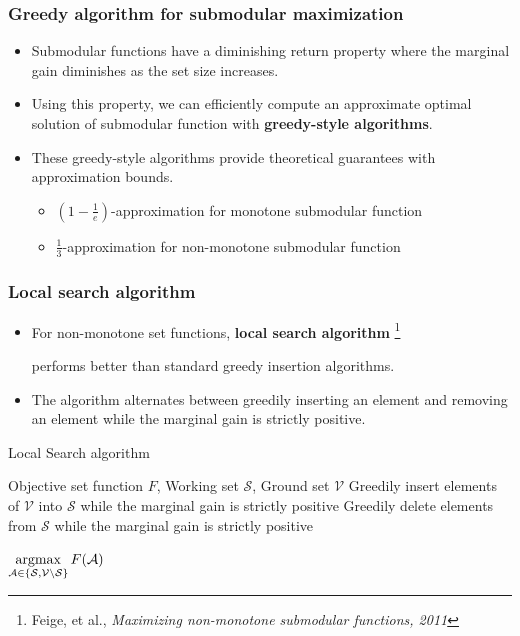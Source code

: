 \documentclass[10pt,mathserif]{beamer}
\newcommand\blfootnote[1]{%
  \begingroup
  \renewcommand\thefootnote{}\footnote{#1}%
  \addtocounter{footnote}{-1}%
  \endgroup
}
\newcommand{\algorithmicinput}{\textbf{input}}
\newcommand{\algorithmicoutput}{\textbf{output}}
\newcommand{\INPUT}{\item[\algorithmicinput]}
\newcommand{\OUTPUT}{\item[\algorithmicoutput]}
\begin{document}
\begin{frame}
\frametitle{Greedy algorithm for submodular maximization}
\begin{itemize}\itemsep=12pt
\item Submodular functions have a diminishing return property where the marginal gain diminishes as the set size increases.\pause
\item Using this property, we can efficiently compute an approximate optimal solution of submodular function with \textbf{greedy-style algorithms}.\pause
\item These greedy-style algorithms provide theoretical guarantees with approximation bounds.
\vspace{0.5em}
\begin{itemize}\itemsep=6pt
    \item $(1-\frac{1}{e})$-approximation for monotone submodular function
    \item $\frac{1}{3}$-approximation for non-monotone submodular function
\end{itemize} 
\end{itemize}
\end{frame}

\begin{frame}
\frametitle{Local search algorithm}
\begin{itemize}\itemsep=10pt
    \item For non-monotone set functions, \textbf{local search algorithm}\blfootnote{Feige, et al., \textit{Maximizing non-monotone submodular functions, 2011}} performs better than standard greedy insertion algorithms.\pause
    \item The algorithm alternates between greedily inserting an element and removing an element while the marginal gain is strictly positive.\pause
\end{itemize}
\setcounter{algorithm}{0}
\begin{algorithm}[H]
\footnotesize
\caption{Local Search algorithm}
\label{alg:local_search}
\begin{algorithmic}[1]
\INPUT Objective set function $F$, Working set $\mathcal{S}$, Ground set $\mathcal{V}$
\STATE Greedily insert elements of $\mathcal{V}$ into $\mathcal{S}$ while the marginal gain is strictly positive
\STATE Greedily delete elements from $\mathcal{S}$ while the marginal gain is strictly positive
\ENDFOR
\OUTPUT $\mathop{\rm argmax}\limits_{\mathcal{A} \in \{\mathcal{S}, \mathcal{V} \setminus \mathcal{S} \}} F(\mathcal{A})$
\end{algorithmic}
\end{algorithm}
\end{frame}
\end{document}
